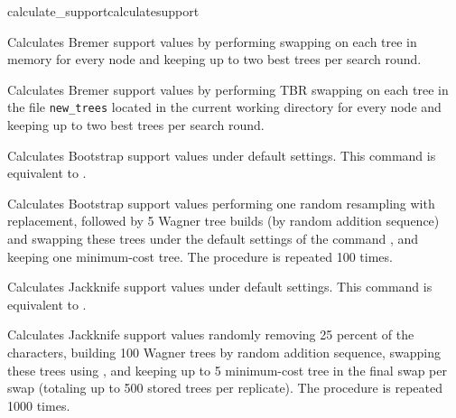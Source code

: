 \begin{command}{calculate\_support}{calculatesupport}
\begin{poyexamples}
{Calculates Bremer support values by performing swapping on 
each tree in memory for every node and keeping up to two
best trees per search round.}

{Calculates Bremer support values by performing TBR swapping on 
each tree in the file \texttt{new\_trees} located in the current
working directory for every node and keeping up to two
best trees per search round.} 

{Calculates Bootstrap support values under default settings. This
command is equivalent to .}

{Calculates Bootstrap support values performing one random resampling with
replacement, followed by 5 Wagner tree builds (by random addition sequence)
and swapping these trees under the default settings of the command 
, and keeping one minimum-cost tree. The procedure
is repeated 100 times.}

{Calculates Jackknife support values under default settings. This command
is equivalent to .}   

{Calculates Jackknife support values randomly removing 25 percent
of the characters, building 100 Wagner trees by random addition
sequence, swapping these trees using , and keeping
up to 5 minimum-cost tree in the final swap per swap (totaling up
to 500 stored trees per replicate). The procedure is repeated 1000
times.}

\end{poyexamples}

\begin{poyalso}
\end{poyalso}

\end{command}

